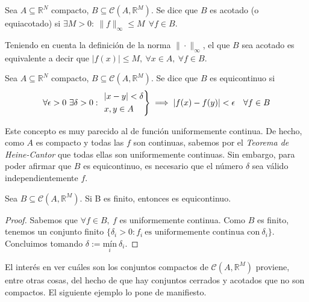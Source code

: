 \begin{ndef}
  Sea $A \subseteq \mathbb{R}^N$ compacto, $B \subseteq \mathcal{C}(A,\mathbb{R}^M)$. Se dice que $B$ es acotado (o equiacotado) si $\exists M > 0: \ \|f\|_{\infty} \le M \ \ \forall f \in B$.
\end{ndef}

\begin{nota}
  Teniendo en cuenta la definición de la norma $\|\cdot\|_\infty$, el que $B$ sea acotado es equivalente a decir que $|f(x)|\le M,\ \forall x \in A,\ \forall f \in B$.
\end{nota}

\begin{ndef}
  Sea $A \subseteq  \mathbb{R}^N$ compacto, $B \subseteq \mathcal{C}(A,\mathbb{R}^M)$. Se dice que $B$ es equicontinuo si $$\forall \epsilon > 0\ \exists \delta > 0:\ \begin{rcases} |x-y| < \delta\\ x,y \in A \end{rcases} \implies |f(x) - f(y)| < \epsilon \quad \forall f \in B$$
\end{ndef}

\begin{nota}
  Este concepto es muy parecido al de función uniformemente continua. De hecho, como $A$ es compacto y todas las $f$ son continuas, sabemos por el \textit{Teorema de Heine-Cantor} que todas ellas son uniformemente continuas. Sin embargo, para poder afirmar que $B$ es equicontinuo, es necesario que el número $\delta$ sea válido independientemente $f$.
\end{nota}

\begin{nprop} Sea $B \subseteq \mathcal{C}(A,\mathbb{R}^M)$. Si B es finito, entonces es equicontinuo.
\end{nprop}

  \begin{proof}
    Sabemos que $\forall f \in B,\ f$ es uniformemente continua. Como $B$ es finito, tenemos un conjunto finito $\{\delta_i > 0 : f_i \ \text{es uniformemente continua con} \ \delta_i\}$. Concluimos tomando $\delta := \underset{i}{\text{mín}} \ \delta_i$.
  \end{proof}

El interés en ver cuáles son los conjuntos compactos de $\mathcal{C}(A,\mathbb{R}^M)$ proviene, entre otras cosas, del hecho de que hay conjuntos cerrados y acotados que no son compactos. El siguiente ejemplo lo pone de manifiesto.

